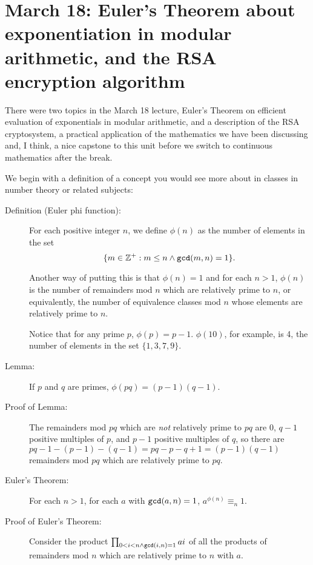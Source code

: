 \documentclass[12pt]{article}
\begin{document}
\section{March 18:  Euler's Theorem about exponentiation in modular arithmetic, and the RSA encryption algorithm}

There were two topics in the March 18 lecture, Euler's Theorem on efficient evaluation of exponentials in modular arithmetic, and a description of the RSA cryptosystem, a practical application of the mathematics we have been discussing and, I think, a nice capstone to this unit before we switch to continuous mathematics after the break.

We begin with a definition of a concept you would see more about in classes in number theory or related subjects:

\begin{description}

\item[Definition (Euler phi function):]  For each positive integer $n$, we define $\phi(n)$ as the number of elements in the set $$\{m \in {\mathbb Z}^+:m \leq n \wedge {\tt gcd}(m,n) = 1\}.$$

Another way of putting this is that $\phi(n)=1$ and for each $n>1$, $\phi(n)$ is the number of remainders mod $n$ which are relatively prime to $n$, or equivalently, the number of equivalence classes mod $n$ whose elements are relatively prime to $n$.

Notice that for any prime $p$, $\phi(p) = p-1$.  $\phi(10)$, for example, is 4, the number of elements in the set $\{1,3,7,9\}$.

\item[Lemma:]  If $p$ and $q$ are primes, $\phi(pq) = (p-1)(q-1)$.

\item[Proof of Lemma:]  The remainders mod $pq$ which are {\em not\/} relatively prime to $pq$ are 0,
$q-1$ positive multiples of $p$, and $p-1$ positive multiples of $q$, so there are $pq-1-(p-1)-(q-1) = pq-p-q+1 = (p-1)(q-1)$ remainders mod $pq$ which are relatively prime to $pq$.

\item[Euler's Theorem:]  For each $n>1$, for each $a$ with ${\tt gcd}(a,n)=1$, $a^{\phi(n)} \equiv_n 1$.

\item[Proof of Euler's Theorem:]  Consider the product $\prod_{0<i<n \wedge {\tt gcd}(i,n)=1} ai$ of all the products of remainders mod $n$ which are relatively prime to $n$ with $a$.


\end{description}
\end{document}
